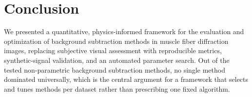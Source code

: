 \documentclass[iucr]{iucrjournals}
\begin{document}


\section{Conclusion}
\label{sec:conclusion}

We presented a quantitative, physics-informed framework for the evaluation and optimization of background subtraction methods in muscle fiber diffraction images, replacing subjective visual assessment with reproducible metrics, synthetic-signal validation, and an automated parameter search. Out of the tested non-parametric background subtraction methods, no single method dominated universally, which is the central argument for a framework that selects and tunes methods per dataset rather than prescribing one fixed algorithm.
% 


\end{document}
